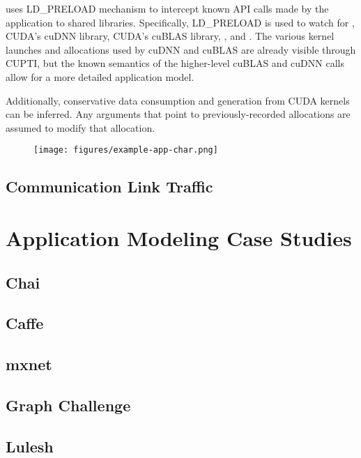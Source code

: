  uses LD\_PRELOAD mechanism to intercept known API calls made by the application to shared libraries.
Specifically, LD\_PRELOAD is used to watch for , CUDA's cuDNN library, CUDA's cuBLAS library, , and .
The various kernel launches and allocations used by cuDNN and cuBLAS are already visible through CUPTI, but the known semantics of the higher-level cuBLAS and cuDNN calls allow for a more detailed application model.


Additionally, conservative data consumption and generation from CUDA kernels can be inferred.
Any arguments that point to previously-recorded allocations are assumed to modify that allocation.

\begin{figure}[ht]
    \centering
    \texttt{[image: figures/example-app-char.png]}
    \caption{}
    \label{fig:example-app-char}
\end{figure}


\subsection{Communication Link Traffic}



\section{Application Modeling Case Studies}
\subsection{Chai}
\subsection{Caffe}
\subsection{mxnet}
\subsection{Graph Challenge}
\subsection{Lulesh}
